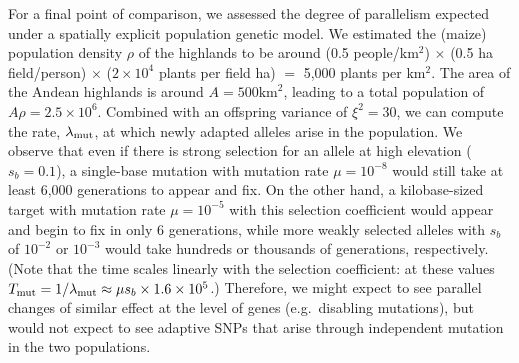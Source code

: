 {{For a final point of comparison,
we assessed the degree of parallelism expected under a spatially explicit population genetic model.
We estimated the (maize) population density $\rho$ of the highlands to be around
(0.5 people/km$^2$) $\times$ (0.5 ha field/person) $\times$ ($2\times10^4$ plants per field ha) $=$ 5,000 plants per km$^2$.
The area of the Andean highlands is around $A=500\text{km}^2$, leading to a total population of $A \rho = 2.5 \times 10^6$.
Combined with an offspring variance of $\xi^2 = 30$,
we can compute the rate, $\lambda_{\text{mut}}$, at which newly adapted alleles arise in the population.
We observe that even if there is strong selection for an allele at high elevation ($s_b=0.1$),
a single-base mutation with mutation rate $\mu=10^{-8}$ would still take at least 6,000 generations to appear and fix.
On the other hand, a kilobase-sized target with mutation rate $\mu=10^{-5}$
with this selection coefficient would appear and begin to fix in only 6 generations,
while more weakly selected alleles with $s_b$ of $10^{-2}$ or $10^{-3}$ would take hundreds or thousands of generations, respectively.
(Note that the time scales linearly with the selection coefficient: at these values $T_{\text{mut}} = 1/\lambda_{\text{mut}} \approx \mu s_b \times 1.6\times 10^5$.)
Therefore, we might expect to see parallel changes of similar effect at the level of genes (e.g.\ disabling mutations),
but would not expect to see adaptive SNPs that arise through independent mutation in the two populations.


}}

